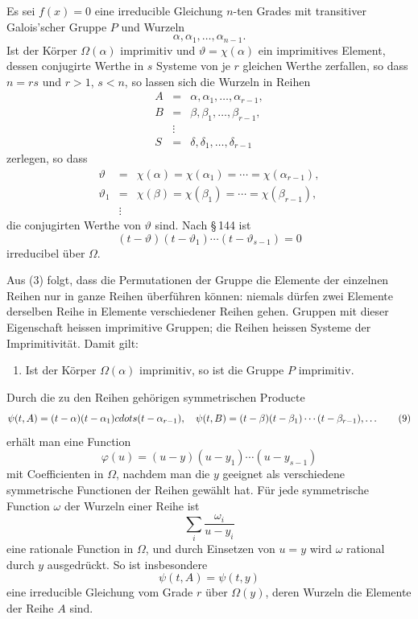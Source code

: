 \documentclass[11pt]{article}
\begin{document}
Es sei $f(x)=0$ eine irreducible Gleichung $n$-ten Grades mit transitiver Galois'scher Gruppe $P$ und Wurzeln
\[
        \alpha,\alpha_1,\ldots,\alpha_{n-1}.
\tag{1}
\]
Ist der Körper $\Omega(\alpha)$ imprimitiv und $\vartheta=\chi(\alpha)$ ein imprimitives Element, dessen conjugirte Werthe in $s$ Systeme von je $r$ gleichen Werthe zerfallen, so dass $n=rs$ und $r>1$, $s<n$, so lassen sich die Wurzeln in Reihen
\[
\begin{array}{lll}
        A&=&\alpha,\alpha_1,\ldots,\alpha_{r-1},\\
        B&=&\beta,\beta_1,\ldots,\beta_{r-1},\\
        &\vdots&\\
        S&=&\delta,\delta_1,\ldots,\delta_{r-1}
\end{array}
\tag{2}
\]
zerlegen, so dass
\[
\begin{array}{lll}
        \vartheta&=&\chi(\alpha)=\chi(\alpha_1)=\cdots=\chi(\alpha_{r-1}),\\
        \vartheta_1&=&\chi(\beta)=\chi(\beta_1)=\cdots=\chi(\beta_{r-1}),\\
        &\vdots&
\end{array}
\tag{3}
\]
die conjugirten Werthe von $\vartheta$ sind. Nach \S\,144 ist
\[
        (t-\vartheta)(t-\vartheta_1)\cdots(t-\vartheta_{s-1})=0
\tag{4}
\]
irreducibel über $\Omega$.

Aus (3) folgt, dass die Permutationen der Gruppe die Elemente der einzelnen Reihen nur in ganze Reihen überführen können: niemals dürfen zwei Elemente derselben Reihe in Elemente verschiedener Reihen gehen. Gruppen mit dieser Eigenschaft heissen imprimitive Gruppen; die Reihen heissen Systeme der Imprimitivität. Damit gilt:
\begin{enumerate}[label=\arabic*.,leftmargin=2em]
\item Ist der Körper $\Omega(\alpha)$ imprimitiv, so ist die Gruppe $P$ imprimitiv.
\end{enumerate}

Durch die zu den Reihen gehörigen symmetrischen Producte
\[
        \psi(t,A)=(t-\alpha)(t-\alpha_1)\\cdots(t-\alpha_{r-1}),\quad
        \psi(t,B)=(t-\beta)(t-\beta_1)\cdots(t-\beta_{r-1}),\ldots
\tag{9}
\]
erhält man eine Function
\[
        \varphi(u)=(u-y)(u-y_1)\cdots(u-y_{s-1})
\tag{10}
\]
mit Coefficienten in $\Omega$, nachdem man die $y$ geeignet als verschiedene symmetrische Functionen der Reihen gewählt hat. Für jede symmetrische Function $\omega$ der Wurzeln einer Reihe ist
\[
        \sum_i \frac{\omega_i}{u-y_i}
\]
eine rationale Function in $\Omega$, und durch Einsetzen von $u=y$ wird $\omega$ rational durch $y$ ausgedrückt. So ist insbesondere
\[
        \psi(t,A)=\psi(t,y)
\tag{11}
\]
eine irreducible Gleichung vom Grade $r$ über $\Omega(y)$, deren Wurzeln die Elemente der Reihe $A$ sind.
\end{document}
